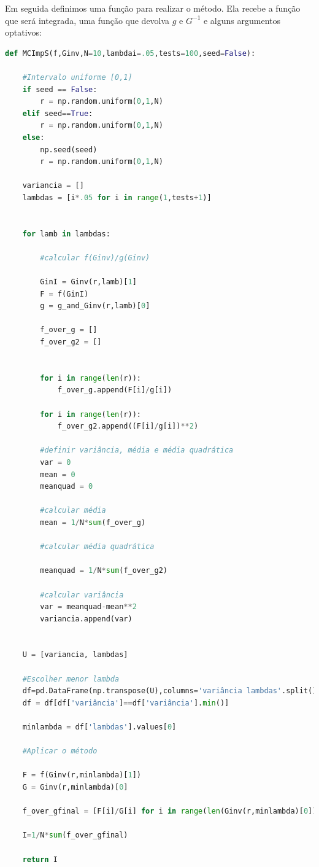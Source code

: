 \documentclass{article}
\begin{document}
Em seguida definimos uma função para realizar o método. Ela recebe a função que será integrada, uma função que devolva $g$ e $G^{-1}$ e alguns argumentos optativos:
\begin{lstlisting}[language=Python]
def MCImpS(f,Ginv,N=10,lambdai=.05,tests=100,seed=False):

	#Intervalo uniforme [0,1]
	if seed == False:
		r = np.random.uniform(0,1,N)
	elif seed==True:
		r = np.random.uniform(0,1,N)
	else:
		np.seed(seed)
		r = np.random.uniform(0,1,N)

	variancia = []
	lambdas = [i*.05 for i in range(1,tests+1)]
	

	for lamb in lambdas:

		#calcular f(Ginv)/g(Ginv)
		
		GinI = Ginv(r,lamb)[1]
		F = f(GinI)
		g = g_and_Ginv(r,lamb)[0]

		f_over_g = []
		f_over_g2 = []


		for i in range(len(r)):
			f_over_g.append(F[i]/g[i])

		for i in range(len(r)):
			f_over_g2.append((F[i]/g[i])**2)

		#definir variância, média e média quadrática
		var = 0
		mean = 0
		meanquad = 0

		#calcular média
		mean = 1/N*sum(f_over_g)
		
		#calcular média quadrática

		meanquad = 1/N*sum(f_over_g2)

		#calcular variância
		var = meanquad-mean**2
		variancia.append(var)


	U = [variancia, lambdas]

	#Escolher menor lambda
	df=pd.DataFrame(np.transpose(U),columns='variância lambdas'.split())
	df = df[df['variância']==df['variância'].min()]

	minlambda = df['lambdas'].values[0]

	#Aplicar o método
	
	F = f(Ginv(r,minlambda)[1])
	G = Ginv(r,minlambda)[0]

	f_over_gfinal = [F[i]/G[i] for i in range(len(Ginv(r,minlambda)[0]))]

	I=1/N*sum(f_over_gfinal)

	return I
\end{lstlisting}

\printbibliography
\end{document}
